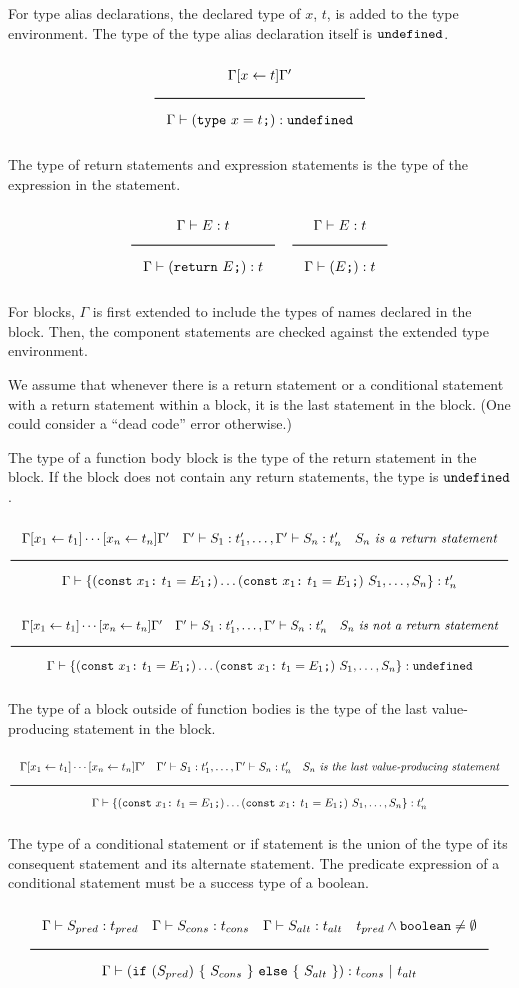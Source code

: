 For type alias declarations, the declared type of $x$, $t$, is added to the type environment.
The type of the type alias declaration itself is $\texttt{undefined}$.

\noindent
\[
  \Rule{\Gamma [x \leftarrow t] \Gamma'}{\Gamma \vdash (\texttt{type}\ x = t\texttt{;}) : \Undefined}
\]
\noindent

The type of return statements and expression statements is the type of the expression in the statement.

\noindent
\[
  \Rule{\Gamma \vdash E : t}{\Gamma \vdash (\texttt{return}\ E\texttt{;}) : t}
  \quad
  \Rule{\Gamma \vdash E : t}{\Gamma \vdash (E\texttt{;}) : t}
\]
\noindent

For blocks, $\Gamma$ is first extended to include the types of names declared in the block.
Then, the component statements are checked against the extended type environment.

We assume that whenever there is a return statement or a conditional statement with a return statement within a
block, it is the last statement in the block. (One could consider a ``dead code'' error otherwise.)

The type of a function body block is the type of the return statement in the block.
If the block does not contain any return statements, the type is $\texttt{undefined}$.

\noindent
\[
  \Rule{\Gamma [x_1 \leftarrow t_1] \cdots [x_n \leftarrow t_n] \Gamma' \quad
    \Gamma' \vdash S_1 : t'_1, \ldots, \Gamma' \vdash S_n : t'_n \quad S_n\ \textit{is a return statement}}{
    \Gamma \vdash \{ (\texttt{const}\ x_1 \texttt{:}\ t_1 = E_1\texttt{;}) \ldots (\texttt{const}\ x_1 \texttt{:}\ t_1 = E_1\texttt{;})\
    S_1, \ldots, S_n\} : t'_n}
\]
\noindent
\[
  \Rule{\Gamma [x_1 \leftarrow t_1] \cdots [x_n \leftarrow t_n] \Gamma' \quad
    \Gamma' \vdash S_1 : t'_1, \ldots, \Gamma' \vdash S_n : t'_n \quad S_n\ \textit{is not a return statement}}{
    \Gamma \vdash \{ (\texttt{const}\ x_1 \texttt{:}\ t_1 = E_1\texttt{;}) \ldots (\texttt{const}\ x_1 \texttt{:}\ t_1 = E_1\texttt{;})\
    S_1, \ldots, S_n\} : \Undefined}
\]
\noindent

The type of a block outside of function bodies is the type of the last value-producing statement in the block.

\noindent
\[
  \Rule{\Gamma [x_1 \leftarrow t_1] \cdots [x_n \leftarrow t_n] \Gamma' \quad
    \Gamma' \vdash S_1 : t'_1, \ldots, \Gamma' \vdash S_n : t'_n \quad S_n\ \textit{is the last value-producing statement}}{
    \Gamma \vdash \{ (\texttt{const}\ x_1 \texttt{:}\ t_1 = E_1\texttt{;}) \ldots (\texttt{const}\ x_1 \texttt{:}\ t_1 = E_1\texttt{;})\
    S_1, \ldots, S_n\} : t'_n}
\]
\noindent

The type of a conditional statement or if statement is the union of the type of its consequent statement and its alternate statement.
The predicate expression of a conditional statement must be a success type of a boolean.

\noindent
\[
  \Rule{\Gamma \vdash S_{pred} : t_{pred} \quad \Gamma \vdash S_{cons} : t_{cons} \quad \Gamma \vdash S_{alt} : t_{alt}
    \quad t_{pred} \wedge \Bool \neq \emptyset}{\Gamma \vdash (\texttt{if}\ (S_{pred})\ \{\ S_{cons}\ \}\
    \texttt{else}\ \{\ S_{alt}\ \}) : t_{cons}\ |\ t_{alt}}
\]
\noindent
